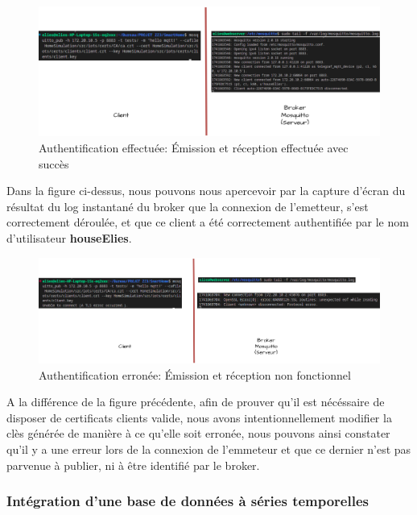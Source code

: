\documentclass[10pt, a4paper]{report}
\begin{document}
	\begin{figure}[h!]
		\centering
		\includegraphics[width=1\textwidth]{ressources/img/preuves/emissionReceptionMosquittoValide.drawio}
		\caption{Authentification effectuée: Émission et réception effectuée avec succès}
		\label{fig:mosquittoValide}
	\end{figure}
	Dans la figure ci-dessus, nous pouvons nous apercevoir par la capture d'écran du résultat du log instantané du broker que la connexion de l'emetteur, s'est correctement déroulée, et que ce client a été correctement authentifiée par le nom d'utilisateur \textbf{houseElies}. \newpage
	
	\begin{figure}[h!]
		\centering
		\includegraphics[width=1\textwidth]{ressources/img/preuves/emissionReceptionMosquittoInvalide.drawio}
		\caption{Authentification erronée: Émission et réception non fonctionnel}
		\label{fig:mosquittoInvalide}
	\end{figure}
	A la différence de la figure précédente, afin de prouver qu'il est nécéssaire de disposer de certificats clients valide, nous avons intentionnellement modifier la clès générée de manière à ce qu'elle soit erronée, nous pouvons ainsi constater qu'il y a une erreur lors de la connexion de l'emmeteur et que ce dernier n'est pas parvenue à publier, ni à être identifié par le broker.
	
	
	
	\subsubsection{Intégration d'une base de données à séries temporelles}
	
\end{document}
